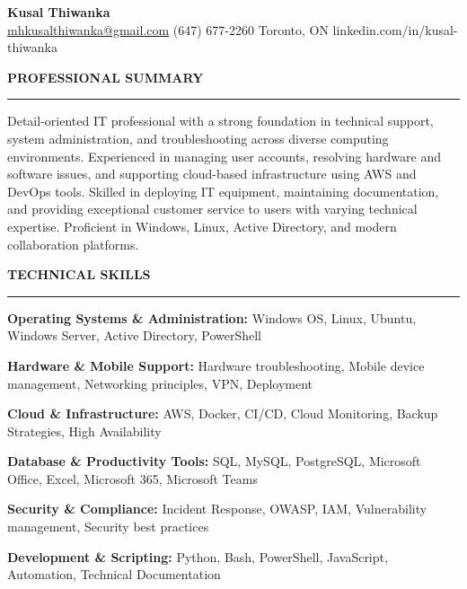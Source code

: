 \documentclass[10pt,letterpaper]{article}
\begin{document}
\begin{center}
{\LARGE\textbf{Kusal Thiwanka}}\\[3pt]
\href{mailto:mhkusalthiwanka@gmail.com}{mhkusalthiwanka@gmail.com}\hspace{2em}%
(647) 677{-}2260\hspace{2em}%
Toronto, ON\hspace{2em}
linkedin.com/in/kusal-thiwanka
\end{center}

\vspace{6pt}

\textbf{PROFESSIONAL SUMMARY}\\[-8pt]
\noindent\rule{\textwidth}{1pt}

\vspace{-2pt}

Detail-oriented IT professional with a strong foundation in technical support, system administration, and troubleshooting across diverse computing environments. Experienced in managing user accounts, resolving hardware and software issues, and supporting cloud-based infrastructure using AWS and DevOps tools. Skilled in deploying IT equipment, maintaining documentation, and providing exceptional customer service to users with varying technical expertise. Proficient in Windows, Linux, Active Directory, and modern collaboration platforms.

\vspace{8pt}

\textbf{TECHNICAL SKILLS}\\[-8pt]
\noindent\rule{\textwidth}{1pt}

\vspace{-2pt}

\textbf{Operating Systems \& Administration:} Windows OS, Linux, Ubuntu, Windows Server, Active Directory, PowerShell

\textbf{Hardware \& Mobile Support:} Hardware troubleshooting, Mobile device management, Networking principles, VPN, Deployment

\textbf{Cloud \& Infrastructure:} AWS, Docker, CI/CD, Cloud Monitoring, Backup Strategies, High Availability

\textbf{Database \& Productivity Tools:} SQL, MySQL, PostgreSQL, Microsoft Office, Excel, Microsoft 365, Microsoft Teams

\textbf{Security \& Compliance:} Incident Response, OWASP, IAM, Vulnerability management, Security best practices

\textbf{Development \& Scripting:} Python, Bash, PowerShell, JavaScript, Automation, Technical Documentation
\end{document}
